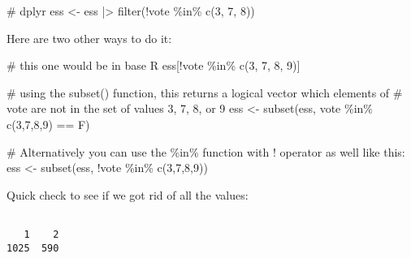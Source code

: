 \documentclass[
  letterpaper,
  DIV=11,
  numbers=noendperiod]{scrreprt}
\newenvironment{Shaded}{\begin{snugshade}}{\end{snugshade}}
\newcommand{\CommentTok}[1]{\textcolor[rgb]{0.37,0.37,0.37}{#1}}
\newcommand{\DecValTok}[1]{\textcolor[rgb]{0.68,0.00,0.00}{#1}}
\newcommand{\FunctionTok}[1]{\textcolor[rgb]{0.28,0.35,0.67}{#1}}
\newcommand{\NormalTok}[1]{\textcolor[rgb]{0.00,0.23,0.31}{#1}}
\newcommand{\OtherTok}[1]{\textcolor[rgb]{0.00,0.23,0.31}{#1}}
\newcommand{\SpecialCharTok}[1]{\textcolor[rgb]{0.37,0.37,0.37}{#1}}
\begin{document}
\begin{Shaded}
\begin{Highlighting}[]
\CommentTok{\# dplyr}
\NormalTok{ess }\OtherTok{\textless{}{-}}\NormalTok{ ess }\SpecialCharTok{|\textgreater{}}
  \FunctionTok{filter}\NormalTok{(}\SpecialCharTok{!}\NormalTok{vote }\SpecialCharTok{\%in\%} \FunctionTok{c}\NormalTok{(}\DecValTok{3}\NormalTok{, }\DecValTok{7}\NormalTok{, }\DecValTok{8}\NormalTok{))}
\end{Highlighting}
\end{Shaded}

Here are two other ways to do it:

\begin{Shaded}
\begin{Highlighting}[]
\CommentTok{\# this one would be in base R}
\NormalTok{ess[}\SpecialCharTok{!}\NormalTok{vote }\SpecialCharTok{\%in\%} \FunctionTok{c}\NormalTok{(}\DecValTok{3}\NormalTok{, }\DecValTok{7}\NormalTok{, }\DecValTok{8}\NormalTok{, }\DecValTok{9}\NormalTok{)]}

\CommentTok{\# using the subset() function, this returns a logical vector which elements of}
\CommentTok{\# vote are not in the set of values 3, 7, 8, or 9}
\NormalTok{ess }\OtherTok{\textless{}{-}} \FunctionTok{subset}\NormalTok{(ess, vote }\SpecialCharTok{\%in\%} \FunctionTok{c}\NormalTok{(}\DecValTok{3}\NormalTok{,}\DecValTok{7}\NormalTok{,}\DecValTok{8}\NormalTok{,}\DecValTok{9}\NormalTok{) }\SpecialCharTok{==}\NormalTok{ F) }

\CommentTok{\# Alternatively you can use the \%in\% function with ! operator as well like this:}
\NormalTok{ess }\OtherTok{\textless{}{-}} \FunctionTok{subset}\NormalTok{(ess, }\SpecialCharTok{!}\NormalTok{vote }\SpecialCharTok{\%in\%} \FunctionTok{c}\NormalTok{(}\DecValTok{3}\NormalTok{,}\DecValTok{7}\NormalTok{,}\DecValTok{8}\NormalTok{,}\DecValTok{9}\NormalTok{))}
\end{Highlighting}
\end{Shaded}

Quick check to see if we got rid of all the values:

\begin{Shaded}
\end{Shaded}

\begin{verbatim}

   1    2 
1025  590 
\end{verbatim}
\end{document}
